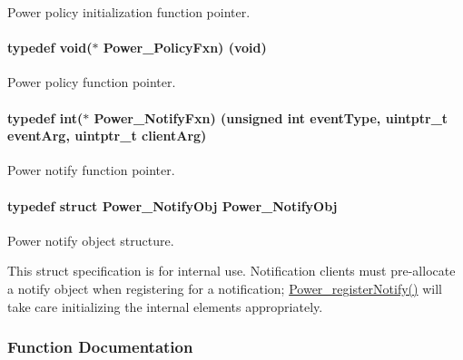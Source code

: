 Power policy initialization function pointer. 

\paragraph[{Power\+\_\+\+Policy\+Fxn}]{\setlength{\rightskip}{0pt plus 5cm}typedef void($\ast$ Power\+\_\+\+Policy\+Fxn) (void)}\label{_power_8h_a333038d1e9cd5f93dda7b83f8a1afa8b}


Power policy function pointer. 

\paragraph[{Power\+\_\+\+Notify\+Fxn}]{\setlength{\rightskip}{0pt plus 5cm}typedef int($\ast$ Power\+\_\+\+Notify\+Fxn) (unsigned int event\+Type, uintptr\+\_\+t event\+Arg, uintptr\+\_\+t client\+Arg)}\label{_power_8h_a91335240b2081eeefec80d043030c857}


Power notify function pointer. 

\paragraph[{Power\+\_\+\+Notify\+Obj}]{\setlength{\rightskip}{0pt plus 5cm}typedef struct {\bf Power\+\_\+\+Notify\+Obj}  {\bf Power\+\_\+\+Notify\+Obj}}\label{_power_8h_a27497a9f3e7d41b6a0c12aa96c2dc766}


Power notify object structure. 

This struct specification is for internal use. Notification clients must pre-\/allocate a notify object when registering for a notification; \hyperlink{_power_8h_a8e73c431e3d1aab1a31181513ceb8adb}{Power\+\_\+register\+Notify()} will take care initializing the internal elements appropriately. 

\subsubsection{Function Documentation}
